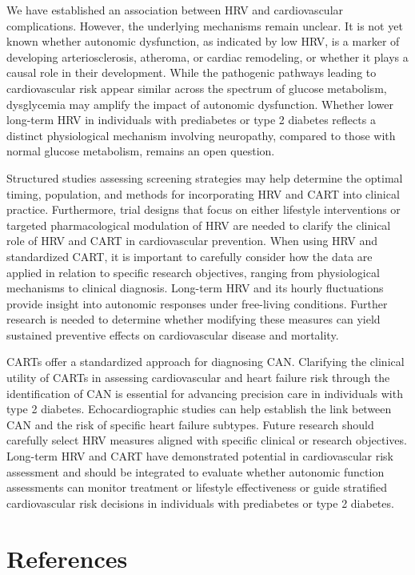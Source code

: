 \documentclass[
  a4paper,
  headsepline=true,
  open=any]{scrbook}
\begin{document}
We have established an association between HRV and cardiovascular
complications. However, the underlying mechanisms remain unclear. It is
not yet known whether autonomic dysfunction, as indicated by low HRV, is
a marker of developing arteriosclerosis, atheroma, or cardiac
remodeling, or whether it plays a causal role in their development.
While the pathogenic pathways leading to cardiovascular risk appear
similar across the spectrum of glucose metabolism, dysglycemia may
amplify the impact of autonomic dysfunction. Whether lower long-term HRV
in individuals with prediabetes or type 2 diabetes reflects a distinct
physiological mechanism involving neuropathy, compared to those with
normal glucose metabolism, remains an open question.

Structured studies assessing screening strategies may help determine the
optimal timing, population, and methods for incorporating HRV and CART
into clinical practice. Furthermore, trial designs that focus on either
lifestyle interventions or targeted pharmacological modulation of HRV
are needed to clarify the clinical role of HRV and CART in
cardiovascular prevention. When using HRV and standardized CART, it is
important to carefully consider how the data are applied in relation to
specific research objectives, ranging from physiological mechanisms to
clinical diagnosis. Long-term HRV and its hourly fluctuations provide
insight into autonomic responses under free-living conditions. Further
research is needed to determine whether modifying these measures can
yield sustained preventive effects on cardiovascular disease and
mortality.

CARTs offer a standardized approach for diagnosing CAN. Clarifying the
clinical utility of CARTs in assessing cardiovascular and heart failure
risk through the identification of CAN is essential for advancing
precision care in individuals with type 2 diabetes. Echocardiographic
studies can help establish the link between CAN and the risk of specific
heart failure subtypes. Future research should carefully select HRV
measures aligned with specific clinical or research objectives.
Long-term HRV and CART have demonstrated potential in cardiovascular
risk assessment and should be integrated to evaluate whether autonomic
function assessments can monitor treatment or lifestyle effectiveness or
guide stratified cardiovascular risk decisions in individuals with
prediabetes or type 2 diabetes.


\hypertarget{references}{%
\chapter*{References}\label{references}}
\end{document}
